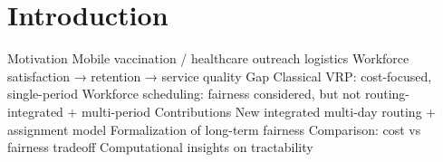 \section{Introduction}

Motivation
Mobile vaccination / healthcare outreach logistics
Workforce satisfaction → retention → service quality
Gap
Classical VRP: cost-focused, single-period
Workforce scheduling: fairness considered, but not routing-integrated + multi-period
Contributions
New integrated multi-day routing + assignment model
Formalization of long-term fairness
Comparison: cost vs fairness tradeoff
Computational insights on tractability

